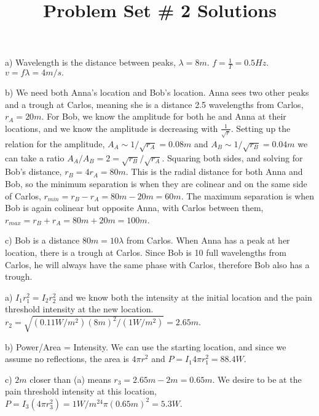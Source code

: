 \documentclass[10pt]{article}
\newenvironment{problem}[2][Problem]{\begin{trivlist}
\item[\hskip \labelsep {\bfseries #1}\hskip \labelsep {\bfseries #2.}]}{\end{trivlist}}
\begin{document}
 \title{Problem Set \# 2 Solutions}
\date{}
\maketitle

\begin{problem}{1}
\item a) Wavelength is the distance between peaks, $\lambda = 8m$. $f=\frac{1}{T}=0.5Hz$. $v=f\lambda=4m/s.$
\item b) We need both Anna's location and Bob's location. Anna sees two other peaks and a trough at Carlos, meaning she is a distance 2.5 wavelengths from Carlos, $r_A=20m$. For Bob, we know the amplitude for both he and Anna at their locations, and we know the amplitude is decreasing with $\frac{1}{\sqrt{r}}$. Setting up the relation for the amplitude, $A_A \sim 1/\sqrt{r_A}=0.08m$ and $A_B \sim 1/\sqrt{r_B}=0.04m$ we can take a ratio $A_A/A_B=2=\sqrt{r_B}/\sqrt{r_A}$. Squaring both sides, and solving for Bob's distance, $r_B= 4r_A=80m$. This is the radial distance for both Anna and Bob, so the minimum separation is when they are colinear and on the same side of Carlos, $r_{min}=r_B-r_A=80m-20m=60m$. The maximum separation is when Bob is again colinear but opposite Anna, with Carlos between them, $r_{max}=r_B+r_A=80m+20m=100m$.
\item c) Bob is a distance $80m=10\lambda$ from Carlos. When Anna has a peak at her location, there is a trough at Carlos. Since Bob is 10 full wavelengths from Carlos, he will always have the same phase with Carlos, therefore Bob also has a trough.
\end{problem}
 
\begin{problem}{2}
\item a) $I_1r_1^2 = I_2r_2^2$ and we know both the intensity at the initial location and the pain threshold intensity at the new location. $r_2 = \sqrt{(0.11W/m^2)(8m)^2/(1 W/m^2)}=2.65m$.
\item b) Power/Area = Intensity. We can use the starting location, and since we assume no reflections, the area is $4\pi r^2$ and  $P=I_1 4\pi r_1^2=88.4W$.
\item c) $2m$ closer than (a) means $r_3=2.65m-2m=0.65m$. We desire to be at the pain threshold intensity at this location, $P=I_3(4\pi r_3^2)=1W/m^24\pi(0.65m)^2=5.3W$.
\end{problem}
\end{document}
